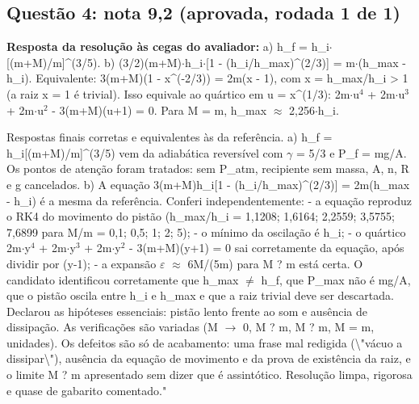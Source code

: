 \documentclass{article}%
\begin{document}
\subsection*{Questão 4: nota 9,2 (aprovada, rodada 1 de 1)}%
\textbf{Resposta da resolução às cegas do avaliador:} a) h\_f = h\_i$\cdot${[}(m+M)/m{]}\^{}(3/5).\newline%
\newline%
b) (3/2)(m+M)$\cdot$h\_i$\cdot${[}1 - (h\_i/h\_max)\^{}(2/3){]} = m$\cdot$(h\_max - h\_i). Equivalente: 3(m+M)(1 - x\^{}(-2/3)) = 2m(x - 1), com x = h\_max/h\_i > 1 (a raiz x = 1 é trivial). Isso equivale ao quártico em u = x\^{}(1/3): 2m$\cdot$u$^{4}$ + 2m$\cdot$u$^3$ + 2m$\cdot$u$^2$ - 3(m+M)(u+1) = 0. Para M = m, h\_max $\approx$ 2,256$\cdot$h\_i.\par %
Respostas finais corretas e equivalentes às da referência.\newline%
\newline%
a) h\_f = h\_i{[}(m+M)/m{]}\^{}(3/5) vem da adiabática reversível com $\gamma$ = 5/3 e P\_f = mg/A. Os pontos de atenção foram tratados: sem P\_atm, recipiente sem massa, A, n, R e g cancelados.\newline%
\newline%
b) A equação 3(m+M)h\_i{[}1 - (h\_i/h\_max)\^{}(2/3){]} = 2m(h\_max - h\_i) é a mesma da referência. Conferi independentemente:\newline%
{-} a equação reproduz o RK4 do movimento do pistão (h\_max/h\_i = 1,1208; 1,6164; 2,2559; 3,5755; 7,6899 para M/m = 0,1; 0,5; 1; 2; 5);\newline%
{-} o mínimo da oscilação é h\_i;\newline%
{-} o quártico 2m$\cdot$y$^{4}$ + 2m$\cdot$y$^3$ + 2m$\cdot$y$^2$ - 3(m+M)(y+1) = 0 sai corretamente da equação, após dividir por (y-1);\newline%
{-} a expansão $\varepsilon$ $\approx$ 6M/(5m) para M ? m está certa.\newline%
\newline%
O candidato identificou corretamente que h\_max $\neq$ h\_f, que P\_max não é mg/A, que o pistão oscila entre h\_i e h\_max e que a raiz trivial deve ser descartada. Declarou as hipóteses essenciais: pistão lento frente ao som e ausência de dissipação. As verificações são variadas (M $\to$ 0, M ? m, M ? m, M = m, unidades).\newline%
\newline%
Os defeitos são só de acabamento: uma frase mal redigida (\textbackslash{}"vácuo a dissipar\textbackslash{}"), ausência da equação de movimento e da prova de existência da raiz, e o limite M ? m apresentado sem dizer que é assintótico. Resolução limpa, rigorosa e quase de gabarito comentado."%
\end{document}
